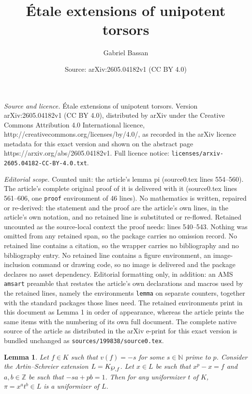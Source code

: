 \documentclass[10pt,a4paper]{amsart}
\title{Étale extensions of unipotent torsors}
\author{Gabriel Bassan}
\date{Source: arXiv:2605.04182v1 (CC BY 4.0)}
\newtheorem{lemma}{Lemma}
\renewcommand{\wp}{\ensuremath\raisebox{\depth}{$\mathchar"17D$}}
\begin{document}
\maketitle

\noindent\emph{Source and licence.} Étale extensions of unipotent torsors. Version arXiv:2605.04182v1 (CC BY 4.0), distributed by arXiv under the Creative Commons Attribution 4.0 International licence, http://creativecommons.org/licenses/by/4.0/, as recorded in the arXiv licence metadata for this exact version and shown on the abstract page https://arxiv.org/abs/2605.04182v1. Full licence notice: \texttt{licenses/arxiv-2605.04182-CC-BY-4.0.txt}.\par\smallskip

\noindent\textit{Editorial scope.} Counted unit: the article's lemma pi (source0.tex lines 554--560). The article's complete original proof of it is delivered with it (source0.tex lines 561--606, one \texttt{proof} environment of 46 lines). No mathematics is written, repaired or re-derived: the statement and the proof are the article's own lines, in the article's own notation, and no retained line is substituted or re-flowed.  Retained uncounted as the source-local context the proof needs: lines 540--543.  Nothing was omitted from any retained span, so the package carries no omission record.  No retained line contains a citation, so the wrapper carries no bibliography and no bibliography entry.  No retained line contains a figure environment, an image-inclusion command or drawing code, so no image is delivered and the package declares no asset dependency.  Editorial formatting only, in addition: an AMS \texttt{amsart} preamble that restates the article's own declarations and macros used by the retained lines, namely the environments \texttt{lemma} on separate counters, together with the standard packages those lines need.  The retained environments print in this document as Lemma 1 in order of appearance, whereas the article prints the same items with the numbering of its own full document.  The complete native source of the article as distributed in the arXiv e-print for this exact version is bundled unchanged as \texttt{sources/199838/source0.tex}.
\begin{lemma}\label{uniformizador de L}
     Let $f\in K$ such that $v(f)=-s$ for some $s\in \mathbb{N}$ prime to $p$. Consider the Artin--Schreier extension $L=K_{\wp, f}$. Let $x\in L$ be such that $x^{p}-x=f$ and $a,b\in \mathbb{Z}$ be such that $-sa+pb=1$.
    Then for any uniformizer $t$ of $K$, $\pi=x^{a}t^{b}\in L$ is a uniformizer of $L$.
\end{lemma}
\end{document}
